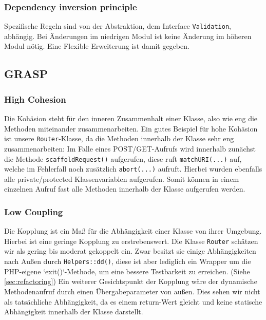 \documentclass[12pt,a4paper,titlepage,ngerman,pdftex]{report}
\begin{document}
    \subsubsection{Dependency inversion principle}
    Spezifische Regeln sind von der Abstraktion, dem Interface \verb|Validation|, abhängig. Bei Änderungen im niedrigen Modul ist keine Änderung im höheren Modul nötig. Eine Flexible Erweiterung ist damit gegeben.
    \subsection{GRASP}
    \label{subsec:grasp}

    \subsubsection{High Cohesion}
    Die Kohäsion steht für den inneren Zusammenhalt einer Klasse, also wie \glqq eng\grqq{} die Methoden miteinander zusammenarbeiten.
    Ein gutes Beispiel für hohe Kohäsion ist unsere \verb|Router|-Klasse, da die Methoden innerhalb der Klasse sehr eng zusammenarbeiten:
    Im Falle eines POST/GET-Aufrufs wird innerhalb zunächst die Methode \verb|scaffoldRequest()| aufgerufen, diese ruft \verb|matchURI(...)| auf, welche im Fehlerfall noch zusätzlich \verb|abort(...)| aufruft.
    Hierbei wurden ebenfalls alle private/protected Klassenvariablen aufgerufen.
    Somit können in einem einzelnen Aufruf fast alle Methoden innerhalb der Klasse aufgerufen werden.

    \subsubsection{Low Coupling}
    Die Kopplung ist ein Maß für die Abhängigkeit einer Klasse von ihrer Umgebung.
    Hierbei ist eine geringe Kopplung zu erstrebenswert.
    Die Klasse \verb|Router| schätzen wir als gering bis moderat gekoppelt ein.
    Zwar besitzt sie einige Abhängigkeiten nach Außen durch \verb|Helpers::dd()|, diese ist aber lediglich ein Wrapper um die PHP-eigene `exit()`-Methode, um eine bessere Testbarkeit zu erreichen. (Siehe \ref{sec:refactoring})
    Ein weiterer Gesichtspunkt der Kopplung wäre der dynamische Methodenaufruf durch einen Übergabeparameter von außen.
    Dies sehen wir nicht als tatsächliche Abhängigkeit, da es einem return-Wert gleicht und keine statische Abhängigkeit innerhalb der Klasse darstellt.
    
\end{document}
